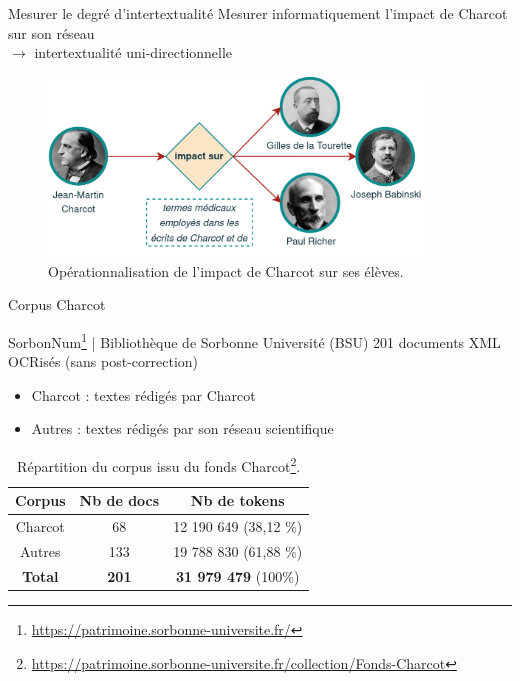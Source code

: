 \begin{frame}{Mesurer le degré d'intertextualité}
Mesurer informatiquement l'impact de Charcot sur son \og{}réseau\fg{} \\$\rightarrow$ intertextualité uni-directionnelle\\
\begin{figure}[!h]
    \centering
\includegraphics[width=100mm,scale=0.5]{pic/charcot_intertextualite.png}
    \caption{Opérationnalisation de l'impact de Charcot sur ses élèves.}
    \label{fig:my_label}
\end{figure}
\end{frame}

\begin{frame}{Corpus Charcot}
\begin{block}{SorbonNum\footnote{\tiny{\url{https://patrimoine.sorbonne-universite.fr/}}} | Bibliothèque de Sorbonne Université (BSU)}
201 documents XML OCRisés (sans post-correction)
\end{block}
\begin{itemize}
    \item \textrm{Charcot} : textes rédigés par Charcot
    \item \textrm{Autres} : textes rédigés par son réseau scientifique
\end{itemize}
\begin{table}[!ht]
    \centering
    \begin{tabular}{|c|c|c|}
    \hline 
    \rowcolor{gray!30}
       Corpus & Nb de docs & Nb de tokens \\
       \hline
       \textrm{Charcot}  & 68 & 12 190 649 (38,12 \%) \\
       \textrm{Autres}  & 133 & 19 788 830 (61,88 \%) \\
       \hline\hline
       \textbf{Total} & \textbf{201} & \textbf{31 979 479} (100\%)\\
       \hline
    \end{tabular}
    \caption{Répartition du corpus issu du fonds Charcot\footnote{\tiny{\url{https://patrimoine.sorbonne-universite.fr/collection/Fonds-Charcot}}}.}
    \label{tab:my_label}
\end{table}
\end{frame}

